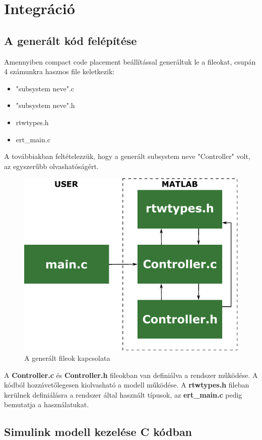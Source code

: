 \section{Integráció}

\subsection{A generált kód felépítése}

Amennyiben compact code placement beállítással generáltuk le a fileokat, csupán 4 számunkra hasznos file keletkezik:

\begin{itemize}

    \item "subsystem neve".c
    \item "subsystem neve".h
    \item rtwtypes.h
    \item ert\_main.c

\end{itemize}

A továbbiakban feltételezzük, hogy a generált subsystem neve "Controller" volt, az egyszerűbb olvashatóságért.

\begin{figure}[!ht]
    \centering
    \includegraphics[width=0.6\linewidth]{img/rtw}
    \caption{A generált fileok kapcsolata}
    \label{fig:rtw}
\end{figure}

A \textbf{Controller.c} és \textbf{Controller.h} fileokban van definiálva a rendszer működése. A kódból hozzávetőlegesen kiolvasható a modell működése. A \textbf{rtwtypes.h} fileban kerülnek definiálásra a rendszer által használt típusok, az \textbf{ert\_main.c} pedig bemutatja a használatukat.

\subsection{Simulink modell kezelése C kódban}

